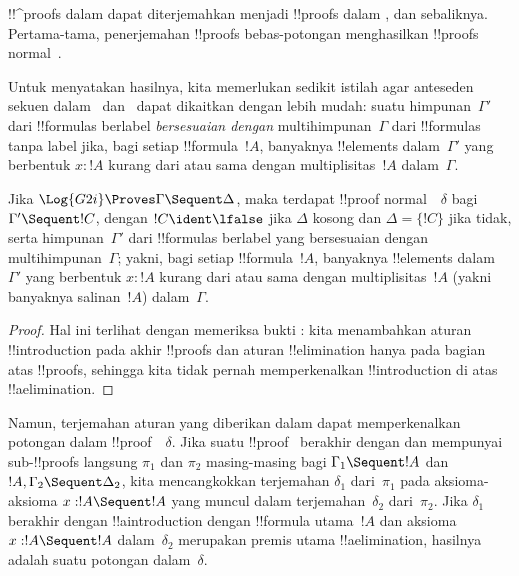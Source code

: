 \documentclass[../../../include/open-logic-section]{subfiles}
\begin{document}


!!^{proof}s dalam  dapat diterjemahkan menjadi !!{proof}s dalam
, dan sebaliknya. Pertama-tama, penerjemahan !!{proof}s bebas-potongan
 menghasilkan !!{proof}s normal~.

Untuk menyatakan hasilnya, kita memerlukan sedikit istilah agar anteseden
sekuen dalam~ dan~ dapat dikaitkan dengan lebih mudah:
suatu himpunan~$\Gamma'$ dari !!{formula}s berlabel \emph{bersesuaian dengan}
multihimpunan~$\Gamma$ dari !!{formula}s tanpa label jika, bagi setiap
!!{formula}~$!A$, banyaknya !!{element}s dalam~$\Gamma'$ yang berbentuk
$x : !A$ kurang dari atau sama dengan multiplisitas~$!A$ dalam~$\Gamma$.

\begin{cor}
Jika $\Log{G2i} \Proves \Gamma \Sequent \Delta$, maka terdapat
!!{proof} normal~~$\delta$ bagi $\Gamma' \Sequent !C$, dengan
$!C \ident \lfalse$ jika $\Delta$ kosong dan $\Delta = \{!C\}$ jika tidak,
serta
himpunan~$\Gamma'$ dari !!{formula}s berlabel yang bersesuaian dengan
multihimpunan~$\Gamma$; yakni, bagi setiap !!{formula}~$!A$, banyaknya
!!{element}s dalam~$\Gamma'$ yang berbentuk $x : !A$ kurang dari atau sama
dengan multiplisitas~$!A$ (yakni banyaknya salinan~$!A$) dalam~$\Gamma$.
\end{cor}

\begin{proof}
Hal ini terlihat dengan memeriksa bukti
: kita menambahkan aturan
!!{introduction} pada akhir !!{proof}s dan aturan !!{elimination} hanya pada
bagian atas !!{proof}s, sehingga kita tidak pernah memperkenalkan
!!{introduction} di atas !!a{elimination}.
\end{proof}

Namun, terjemahan aturan \Cut{} yang diberikan dalam
 dapat memperkenalkan potongan dalam
!!{proof}~~$\delta$. Jika suatu !!{proof}~ berakhir dengan
\Cut{} dan mempunyai sub-!!{proof}s langsung $\pi_1$ dan $\pi_2$ masing-masing
bagi $\Gamma_1 \Sequent !A$ dan $!A, \Gamma_2 \Sequent \Delta_2$, kita
mencangkokkan terjemahan $\delta_1$ dari~$\pi_1$ pada aksioma-aksioma
$x:!A \Sequent !A$ yang muncul dalam terjemahan~$\delta_2$ dari~$\pi_2$.
Jika $\delta_1$ berakhir dengan !!a{introduction} dengan !!{formula}
utama~$!A$ dan
aksioma $x:!A \Sequent !A$ dalam~$\delta_2$ merupakan premis utama
!!a{elimination}, hasilnya adalah suatu potongan dalam~$\delta$.
\end{document}
